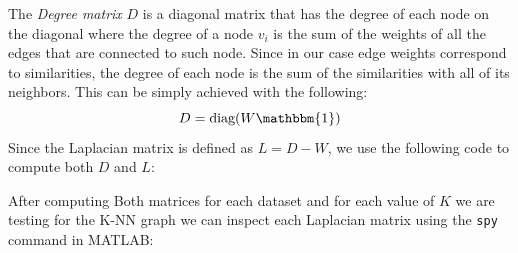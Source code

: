 The \textit{Degree matrix} \(D\) is a diagonal matrix that has the degree of each node on the diagonal where the degree of a node \(v_i\) is the sum of the weights of all the edges that are connected to such node. Since in our case edge weights correspond to similarities, the degree of each node is the sum of the similarities with all of its neighbors. This can be simply achieved with the following:
\begin{equation}
    D = \text{diag}(W \mathbbm{1})
\end{equation}
Since the Laplacian matrix is defined as \(L= D - W\), we use the following code to compute both \(D\) and \(L\):

After computing Both matrices for each dataset and for each value of \(K\) we are testing for the K-NN graph we can inspect each Laplacian matrix using the \texttt{spy} command in MATLAB:
